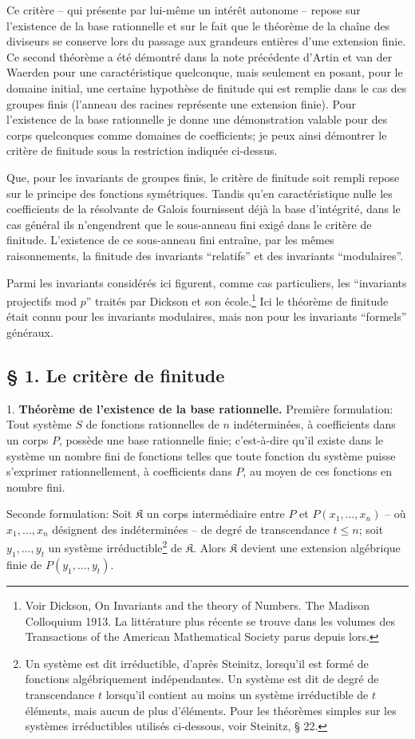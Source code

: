 Ce critère -- qui présente par lui-même un intérêt autonome -- repose sur l'existence de la base rationnelle et sur le fait que le théorème de la chaîne des diviseurs se conserve lors du passage aux grandeurs entières d'une extension finie. Ce second théorème a été démontré dans la note précédente d'Artin et van der Waerden pour une caractéristique quelconque, mais seulement en posant, pour le domaine initial, une certaine hypothèse de finitude qui est remplie dans le cas des groupes finis (l'anneau des racines représente une extension finie). Pour l'existence de la base rationnelle je donne une démonstration valable pour des corps quelconques comme domaines de coefficients; je peux ainsi démontrer le critère de finitude sous la restriction indiquée ci-dessus.

Que, pour les invariants de groupes finis, le critère de finitude soit rempli repose sur le principe des fonctions symétriques. Tandis qu'en caractéristique nulle les coefficients de la résolvante de Galois fournissent déjà la base d'intégrité, dans le cas général ils n'engendrent que le sous-anneau fini exigé dans le critère de finitude. L'existence de ce sous-anneau fini entraîne, par les mêmes raisonnements, la finitude des invariants ``relatifs'' et des invariants ``modulaires''.

Parmi les invariants considérés ici figurent, comme cas particuliers, les ``invariants projectifs mod $p$'' traités par Dickson et son école.\footnote{Voir Dickson, On Invariants and the theory of Numbers. The Madison Colloquium 1913. La littérature plus récente se trouve dans les volumes des Transactions of the American Mathematical Society parus depuis lors.} Ici le théorème de finitude était connu pour les invariants modulaires, mais non pour les invariants ``formels'' généraux.

\subsection*{\S{} 1. Le critère de finitude}

1. \textbf{Théorème de l'existence de la base rationnelle.} Première formulation: Tout système $S$ de fonctions rationnelles de $n$ indéterminées, à coefficients dans un corps $P$, possède une base rationnelle finie; c'est-à-dire qu'il existe dans le système un nombre fini de fonctions telles que toute fonction du système puisse s'exprimer rationnellement, à coefficients dans $P$, au moyen de ces fonctions en nombre fini.

Seconde formulation: Soit $\mathfrak K$ un corps intermédiaire entre $P$ et $P(x_1,\ldots,x_n)$ -- où $x_1,\ldots,x_n$ désignent des indéterminées -- de degré de transcendance $t\leq n$; soit $y_1,\ldots,y_t$ un système irréductible\footnote{Un système est dit irréductible, d'après Steinitz, lorsqu'il est formé de fonctions algébriquement indépendantes. Un système est dit de degré de transcendance $t$ lorsqu'il contient au moins un système irréductible de $t$ éléments, mais aucun de plus d'éléments. Pour les théorèmes simples sur les systèmes irréductibles utilisés ci-dessous, voir Steinitz, \S{} 22.} de $\mathfrak K$. Alors $\mathfrak K$ devient une extension algébrique finie de $P(y_1,\ldots,y_t)$.

